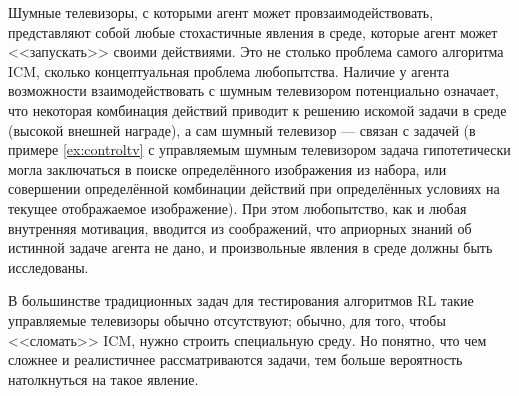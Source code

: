 
Шумные телевизоры, с которыми агент может провзаимодействовать, представляют собой любые стохастичные явления в среде, которые агент может <<запускать>> своими действиями. Это не столько проблема самого алгоритма ICM, сколько концептуальная проблема любопытства. Наличие у агента возможности взаимодействовать с шумным телевизором потенциально означает, что некоторая комбинация действий приводит к решению искомой задачи в среде (высокой внешней награде), а сам шумный телевизор --- связан с задачей (в примере \ref{ex:controltv} с управляемым шумным телевизором задача гипотетически могла заключаться в поиске определённого изображения из набора, или совершении определённой комбинации действий при определённых условиях на текущее отображаемое изображение). При этом любопытство, как и любая внутренняя мотивация, вводится из соображений, что априорных знаний об истинной задаче агента не дано, и произвольные явления в среде должны быть исследованы.

\begin{remark}
В большинстве традиционных задач для тестирования алгоритмов RL такие управляемые телевизоры обычно отсутствуют; обычно, для того, чтобы <<сломать>> ICM, нужно строить специальную среду. Но понятно, что чем сложнее и реалистичнее рассматриваются задачи, тем больше вероятность натолкнуться на такое явление.
\end{remark}





